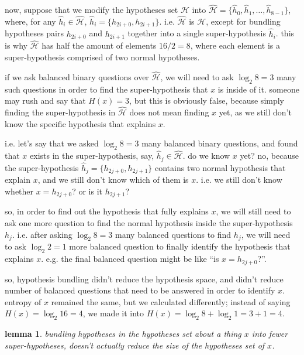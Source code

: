 \documentclass[twocolumn]{article}
\newtheorem{lemma}{lemma}
\begin{document}
now, suppose that we modify the hypotheses set $\mathcal{H}$ into
$\mathcal{\hat H} = \{\hat h_0, \hat h_1, \ldots, \hat h_{8-1}\}$, where,
for any $\hat h_i \in \mathcal{\hat H}$, $\hat h_i = \{h_{2i + 0}, h_{2i +
1}\}$.  i.e. $\mathcal{\hat H}$ is $\mathcal{H}$, except for bundling
hypotheses pairs $h_{2i+0}$ and $h_{2i+1}$ together into a single
super-hypothesis $\hat h_i$.  this is why $\mathcal{\hat H}$ has half the
amount of elements $16/2 = 8$, where each element is a super-hypothesis
comprised of two normal hypotheses.

if we ask balanced binary questions over $\mathcal{\hat H}$, we will need
to ask $\log_2 8 = 3$ many such questions in order to find the
super-hypothesis that $x$ is inside of it.  someone may rush and say that
$H(x)=3$, but this is obviously false, because simply finding the
super-hypothesis in $\mathcal{\hat H}$ does not mean finding $x$ yet, as we
still don't know the specific hypothesis that explains $x$.  

i.e. let's say that we asked $\log_2 8 = 3$ many balanced binary questions,
and found that $x$ exists in the super-hypothesis, say, $\hat h_j \in
\mathcal{\hat H}$.   do we know $x$ yet?  no, because the super-hypothesis
$\hat h_j = \{h_{2j+0}, h_{2j+1}\}$ contains two normal hypothesis that
explain $x$, and we still don't know which of them is $x$.  i.e. we still
don't know whether $x = h_{2j+0}$?  or is it $h_{2j+1}$?

so, in order to find out the hypothesis that fully explains $x$, we will
still need to ask one more question to find the normal hypothesis inside
the super-hypothesis $h_j$.  i.e. after asking $\log_2 8 = 3$ many balanced
questions to find $h_j$, we will need to ask $\log_2 2 = 1$ more balanced
question to finally identify the hypothesis that explains $x$.  e.g. the
final balanced question might be like ``is $x = h_{2j+0}$?''.

so, hypothesis bundling didn't reduce the hypothesis space, and didn't
reduce number of balanced questions that need to be answered in order to
identify $x$.  entropy of $x$ remained the same, but we calculated
differently; instead of saying $H(x)=\log_2 16 = 4$, we made it into
$H(x)=\log_2 8 + \log_2 1 = 3 + 1 = 4$.

\begin{lemma}
    bundling hypotheses in the hypotheses set about a thing $x$ into fewer
    super-hypotheses, doesn't actually reduce the size of the hypotheses
    set of $x$.
\end{lemma}
\end{document}
